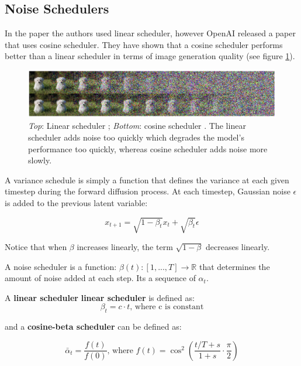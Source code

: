





\subsection{Noise Schedulers}

In the paper \cite{ddpm} the authors used linear scheduler, however OpenAI released a paper \cite{openai_improved_ddpm} that uses cosine scheduler. They have shown that a cosine scheduler performs better than a linear scheduler in terms of image generation quality (see figure \ref{fig:linear_cosine_scheduler}).

\begin{figure}
    \centering
    \includegraphics[width=1\textwidth]{images/diffusion_models/linear_cosine_scheduler.png}
    \caption{\textit{Top}: Linear scheduler \cite{ddpm}; \textit{Bottom}: cosine scheduler \cite{openai_improved_ddpm}. The linear scheduler adds noise too quickly which degrades the model's performance too quickly, whereas cosine scheduler adds noise more slowly.}
    \label{fig:linear_cosine_scheduler}
\end{figure}

A variance schedule is simply a function that defines the variance at each given timestep during the forward diffusion process. At each timestep, Gaussian noise $\epsilon$ is added to the previous latent variable:

\[
    x_{t+1} = \sqrt{1 - \beta_t} x_t + \sqrt{\beta_t} \epsilon
\]

Notice that when $\beta$ increases linearly, the term $\sqrt{1-\beta}$ decreases linearly. 

A noise scheduler is a function: $\beta(t):[1, ..., T] \rightarrow \mathbb{R}$ that determines the amount of noise added at each step. Its a sequence of $\alpha_t$.

A \textbf{linear scheduler} \textbf{linear scheduler} is defined as:
\[
    \beta_t = c \cdot t \text{, where c is constant}
\]

and a \textbf{cosine-beta scheduler} can be defined as:

\[
    \bar{\alpha}_t = \frac{f(t)}{f(0)} \text{, where } f(t) = \cos^2 \left( \frac{t/T + s}{1+s} \cdot \frac{\pi}{2} \right)
\]








